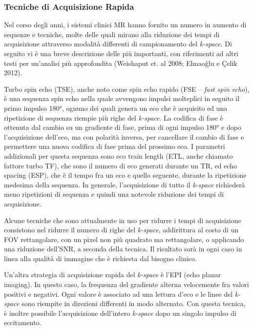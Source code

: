 \documentclass[leqno,10pt,twocolumn,a4paper]{article}
\begin{document}
	\subsubsection{Tecniche di Acquisizione Rapida}
	Nel corso degli anni, i sistemi clinici MR hanno fornito un numero in aumento di sequenze e tecniche, molte delle quali mirano alla riduzione dei tempi di acquisizione attraverso modalità differenti
	di campionamento del \textit{k-space}. Di seguito vi è una breve descrizione delle più importanti, con riferimenti ad altri testi per un'analisi più approfondita (Weishaput et. al 2008; Elmaoĝlu e
	Çelik 2012). \par Turbo spin echo (TSE), anche noto come spin echo rapido (FSE -- \textit{fast spin echo}), è una sequenza spin echo nella quale avvengono impulsi molteplici in seguito il primo
	impulso 180°, ognuno dei quali genera un eco che è acquisito ed una ripetizione di sequenza riempie più righe del \textit{k-space}. La codifica di fase è ottenuta dal cambio su un gradiente di fase,
	prima di ogni impulso 180° e dopo l'acquisizione dell'eco, ma con polarità inversa, per cancellare il cambio di fase e permettere una nuova codifica di fase prima del prossimo eco. I parametri
	addizionali per questa sequenza sono eco train length (ETL, anche chiamato fattore turbo TF), che sono il numero di eco generati durante un TR, ed echo spacing (ESP), che è il tempo fra un 
	eco e quello seguente, durante la ripetizione medesima della sequenza. In generale, l'acquisizione di tutto il \textit{k-space} richiederà meno ripetizioni di sequenza e quindi una notevole 
	riduzione dei tempi di acquisizione. \par Alcune tecniche che sono attualmente in uso per ridurre i tempi di acquisizione consistono nel ridurre il numero di righe del \textit{k-space}, addirittura
	al costo di un FOV rettangolare, con un pixel non più quadrato ma rettangolare, o applicando una riduzione dell'SNR, a seconda della tecnica. Il risultato sarà in ogni caso in linea alla qualità di 
	immagine che è richiesta dal bisogno clinico. \par Un'altra strategia di acquisizione rapida del \textit{k-space} è l'EPI (echo planar imaging). In questo caso, la frequenza del gradiente alterna 
	velocemente fra valori positivi e negativi. Ogni valore è associato ad una lettura d'eco e le linee del \textit{k-space} sono riempite in direzioni differenti in modo alternato. Con questa tecnica,
	è inoltre possibile l'acquisizione dell'intero \textit{k-space} dopo un singolo impulso di eccitamento.
\end{document}
